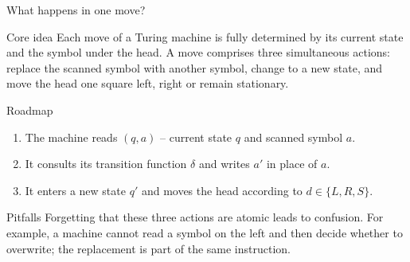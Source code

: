\begin{frame}[t]{What happens in one move?}
  \begin{tblock}{Core idea}
    Each move of a Turing machine is fully determined by its current
    state and the symbol under the head.  A move comprises three
    simultaneous actions: replace the scanned symbol with another
    symbol, change to a new state, and move the head one square left,
    right or remain stationary.
  \end{tblock}
  \begin{tblock}{Roadmap}
    \begin{enumerate}
      \item The machine reads $(q,a)$ – current state $q$ and scanned
        symbol $a$.
      \item It consults its transition function $\delta$ and writes
        $a'$ in place of $a$.
      \item It enters a new state $q'$ and moves the head according to
        $d \in \{L,R,S\}$.
    \end{enumerate}
  \end{tblock}
  \begin{talert}{Pitfalls}
    Forgetting that these three actions are atomic leads to confusion.
    For example, a machine cannot read a symbol on the left and then
    decide whether to overwrite; the replacement is part of the same
    instruction.
  \end{talert}
  \label{fr:7.1-06}
\end{frame}

